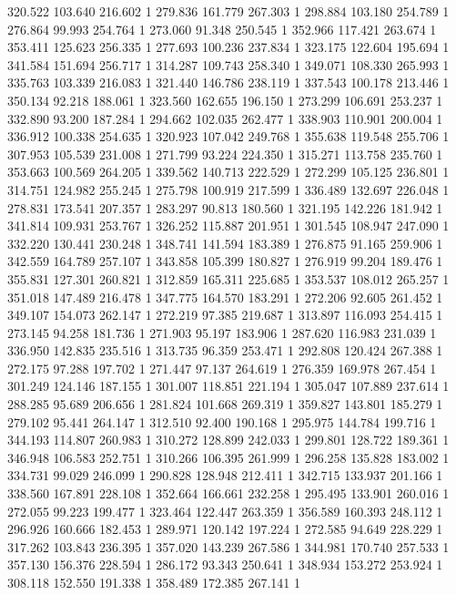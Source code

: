 	320.522	103.640	216.602	1
	279.836	161.779	267.303	1
	298.884	103.180	254.789	1
	276.864	99.993	254.764	1
	273.060	91.348	250.545	1
	352.966	117.421	263.674	1
	353.411	125.623	256.335	1
	277.693	100.236	237.834	1
	323.175	122.604	195.694	1
	341.584	151.694	256.717	1
	314.287	109.743	258.340	1
	349.071	108.330	265.993	1
	335.763	103.339	216.083	1
	321.440	146.786	238.119	1
	337.543	100.178	213.446	1
	350.134	92.218	188.061	1
	323.560	162.655	196.150	1
	273.299	106.691	253.237	1
	332.890	93.200	187.284	1
	294.662	102.035	262.477	1
	338.903	110.901	200.004	1
	336.912	100.338	254.635	1
	320.923	107.042	249.768	1
	355.638	119.548	255.706	1
	307.953	105.539	231.008	1
	271.799	93.224	224.350	1
	315.271	113.758	235.760	1
	353.663	100.569	264.205	1
	339.562	140.713	222.529	1
	272.299	105.125	236.801	1
	314.751	124.982	255.245	1
	275.798	100.919	217.599	1
	336.489	132.697	226.048	1
	278.831	173.541	207.357	1
	283.297	90.813	180.560	1
	321.195	142.226	181.942	1
	341.814	109.931	253.767	1
	326.252	115.887	201.951	1
	301.545	108.947	247.090	1
	332.220	130.441	230.248	1
	348.741	141.594	183.389	1
	276.875	91.165	259.906	1
	342.559	164.789	257.107	1
	343.858	105.399	180.827	1
	276.919	99.204	189.476	1
	355.831	127.301	260.821	1
	312.859	165.311	225.685	1
	353.537	108.012	265.257	1
	351.018	147.489	216.478	1
	347.775	164.570	183.291	1
	272.206	92.605	261.452	1
	349.107	154.073	262.147	1
	272.219	97.385	219.687	1
	313.897	116.093	254.415	1
	273.145	94.258	181.736	1
	271.903	95.197	183.906	1
	287.620	116.983	231.039	1
	336.950	142.835	235.516	1
	313.735	96.359	253.471	1
	292.808	120.424	267.388	1
	272.175	97.288	197.702	1
	271.447	97.137	264.619	1
	276.359	169.978	267.454	1
	301.249	124.146	187.155	1
	301.007	118.851	221.194	1
	305.047	107.889	237.614	1
	288.285	95.689	206.656	1
	281.824	101.668	269.319	1
	359.827	143.801	185.279	1
	279.102	95.441	264.147	1
	312.510	92.400	190.168	1
	295.975	144.784	199.716	1
	344.193	114.807	260.983	1
	310.272	128.899	242.033	1
	299.801	128.722	189.361	1
	346.948	106.583	252.751	1
	310.266	106.395	261.999	1
	296.258	135.828	183.002	1
	334.731	99.029	246.099	1
	290.828	128.948	212.411	1
	342.715	133.937	201.166	1
	338.560	167.891	228.108	1
	352.664	166.661	232.258	1
	295.495	133.901	260.016	1
	272.055	99.223	199.477	1
	323.464	122.447	263.359	1
	356.589	160.393	248.112	1
	296.926	160.666	182.453	1
	289.971	120.142	197.224	1
	272.585	94.649	228.229	1
	317.262	103.843	236.395	1
	357.020	143.239	267.586	1
	344.981	170.740	257.533	1
	357.130	156.376	228.594	1
	286.172	93.343	250.641	1
	348.934	153.272	253.924	1
	308.118	152.550	191.338	1
	358.489	172.385	267.141	1
